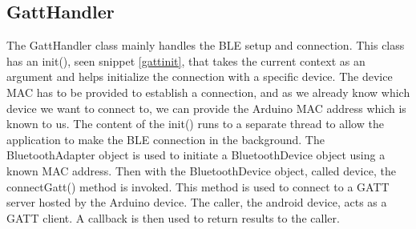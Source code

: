 \subsection{GattHandler}

The GattHandler class mainly handles the BLE setup and connection. This class has an init(), seen snippet \ref{gattinit}, that takes the current context as an argument and helps initialize the connection with a specific device. The device MAC has to be provided to establish a connection, and as we already know which device we want to connect to, we can provide the Arduino MAC address which is known to us. The content of the init() runs to a separate thread to allow the application to make the BLE connection in the background. The BluetoothAdapter object\cite{BluetoothAdapter2022} is used to initiate a BluetoothDevice object\cite{BluetoothDevice2022} using a known MAC address. Then with the BluetoothDevice object, called device, the connectGatt() method is invoked. This method is used to connect to a GATT server hosted by the Arduino device. The caller, the android device, acts as a GATT client. A callback is then used to return results to the caller. 

